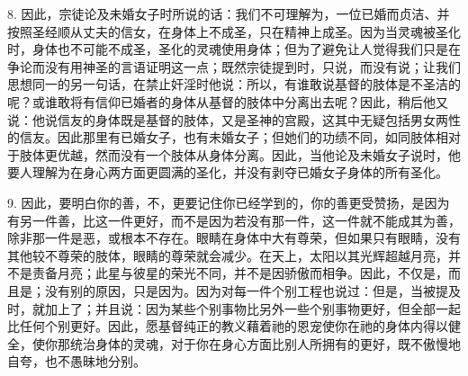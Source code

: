 8. 因此，宗徒论及未婚女子时所说的话：我们不可理解为，一位已婚而贞洁、并按照圣经顺从丈夫的信女，在身体上不成圣，只在精神上成圣。因为当灵魂被圣化时，身体也不可能不成圣，圣化的灵魂使用身体；但为了避免让人觉得我们只是在争论而没有用神圣的言语证明这一点；既然宗徒提到时，只说，而没有说；让我们思想同一的另一句话，在禁止奸淫时他说：所以，有谁敢说基督的肢体是不圣洁的呢？或谁敢将有信仰已婚者的身体从基督的肢体中分离出去呢？因此，稍后他又说：他说信友的身体既是基督的肢体，又是圣神的宫殿，这其中无疑包括男女两性的信友。因此那里有已婚女子，也有未婚女子；但她们的功绩不同，如同肢体相对于肢体更优越，然而没有一个肢体从身体分离。因此，当他论及未婚女子说时，他要人理解为在身心两方面更圆满的圣化，并没有剥夺已婚女子身体的所有圣化。\par

9. 因此，要明白你的善，不，更要记住你已经学到的，你的善更受赞扬，是因为有另一件善，比这一件更好，而不是因为若没有那一件，这一件就不能成其为善，除非那一件是恶，或根本不存在。眼睛在身体中大有尊荣，但如果只有眼睛，没有其他较不尊荣的肢体，眼睛的尊荣就会减少。在天上，太阳以其光辉超越月亮，并不是责备月亮；此星与彼星的荣光不同，并不是因骄傲而相争。因此，不仅是，而且是；没有别的原因，只是因为。因为对每一件个别工程也说过：但是，当被提及时，就加上了；并且说：因为某些个别事物比另外一些个别事物更好，但全部一起比任何个别更好。因此，愿基督纯正的教义藉着祂的恩宠使你在祂的身体内得以健全，使你那统治身体的灵魂，对于你在身心方面比别人所拥有的更好，既不傲慢地自夸，也不愚昧地分别。\par

